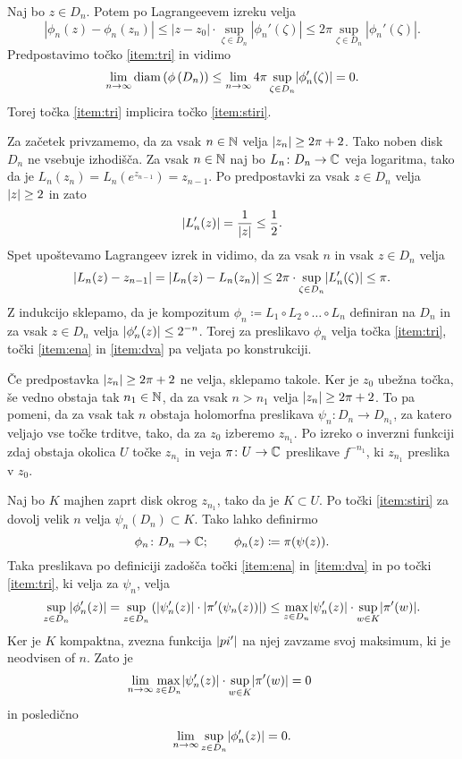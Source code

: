 \begin{dokaz}
    Naj bo \(z \in D_n\). Potem po Lagrangeevem izreku velja
    \begin{equation}
        |\phi_n (z) - \phi_n (z_n)| \leq |z - z_0| \cdot \sup_{\zeta \in D_n} |\phi_n' (\zeta)| \leq 2 \pi \sup_{\zeta \in D_n} |\phi_n' (\zeta)|.
    \end{equation}
    Predpostavimo točko \ref{item:tri} in vidimo
    \[\lim_{n \to \infty} \diam \prt{\phi \prt{D_n}} \leq \lim_{n \to \infty} 4 \pi \sup_{\zeta \in D_n} \abs{\phi_n' (\zeta)} = 0.\]
    Torej točka \ref{item:tri} implicira točko \ref{item:stiri}.

    Za začetek privzamemo, da za vsak \(n \in \mathbb N\) velja \(\lvert z_n\rvert \geq 2 \pi + 2\). Tako noben disk \(D_n\) ne vsebuje izhodišča. Za vsak \(n \in \mathbb N\) naj bo \(L_n \colon D_n \to \mathbb C\) veja logaritma, tako da je \(L_n (z_n) = L_n (e^{z_{n - 1}}) = z_{n - 1}\). Po predpostavki za vsak \(z \in D_n\) velja \(\lvert z\rvert \geq 2\) in zato
    \[\lvert L_n' (z)\rvert = \frac{1}{\lvert z\rvert} \leq \frac{1}{2}.\]
    Spet upoštevamo Lagrangeev izrek in vidimo, da za vsak \(n\) in vsak \(z \in D_n\) velja
    \[\lvert L_n (z) - z_{n - 1}\rvert = \lvert L_n (z) - L_n (z_n)\rvert \leq 2 \pi \cdot \sup_{\zeta \in D_n} \lvert L_n' (\zeta)\rvert \leq \pi.\]
    Z indukcijo sklepamo, da je kompozitum \(\phi_n \coloneq L_1 \circ L_2 \circ \dots \circ L_n\) definiran na \(D_n\) in za vsak \(z \in D_n\) velja \(\lvert\phi_n' (z)\rvert \leq 2^{-n}\). Torej za preslikavo \(\phi_n\) velja točka \ref{item:tri}, točki \ref{item:ena} in \ref{item:dva} pa veljata po konstrukciji.

    Če predpostavka \(\lvert z_n\rvert \geq 2 \pi + 2\) ne velja, sklepamo takole. Ker je \(z_0\) ubežna točka, še vedno obstaja tak \(n_1 \in \mathbb N\), da za vsak \(n > n_1\) velja \(\lvert z_n\rvert \geq 2 \pi + 2\). To pa pomeni, da za vsak tak \(n\) obstaja holomorfna preslikava \(\psi_n \colon D_n \to D_{n_1}\), za katero veljajo vse točke trditve, tako, da za \(z_0\) izberemo \(z_{n_1}\). Po izreko o inverzni funkciji zdaj obstaja okolica \(U\) točke \(z_{n_1}\) in veja \(\pi \colon U \to \mathbb C\) preslikave \(f^{- n_1}\), ki \(z_{n_1}\) preslika v \(z_0\).

    Naj bo \(K\) majhen zaprt disk okrog \(z_{n_1}\), tako da je \(K \subset U\). Po točki \ref{item:stiri} za dovolj velik \(n\) velja \(\psi_n (D_n) \subset K\). Tako lahko definirmo
    \[\phi_n \colon D_n \to \mathbb C; \qquad \phi_n (z) \coloneq \pi (\psi (z)).\]
    Taka preslikava po definiciji zadošča točki \ref{item:ena} in \ref{item:dva} in po točki \ref{item:tri}, ki velja za \(\psi_n\), velja
    \[\sup_{z \in D_n} \lvert\phi_n' (z)\rvert = \sup_{z \in D_n} \left( \lvert\psi_n' (z)\rvert \cdot \lvert\pi' (\psi_n (z))\rvert \right) \leq \max_{z \in D_n} \lvert\psi_n' (z)\rvert \cdot \sup_{w \in K} \lvert\pi' (w)\rvert.\]
    Ker je \(K\) kompaktna, zvezna funkcija \(\lvert pi'\rvert\) na njej zavzame svoj maksimum, ki je neodvisen of \(n\). Zato je
    \[\lim_{n \to \infty} \max_{z \in D_n} \lvert\psi_n' (z)\rvert \cdot \sup_{w \in K} \lvert\pi' (w)\rvert = 0 \qquad\]
    in posledično
    \[\lim_{n \to \infty} \sup_{z \in D_n} \lvert\phi_n' (z)\rvert = 0.\]
\end{dokaz}


